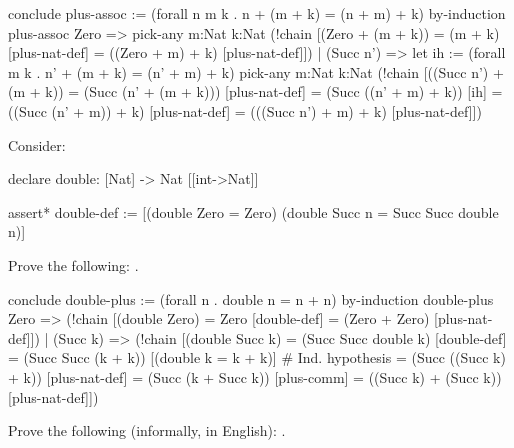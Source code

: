\begin{solution}
\begin{tcAthena}
conclude plus-assoc := (forall n m k . n + (m + k) = (n + m) + k)
  by-induction plus-assoc {
    Zero => pick-any m:Nat k:Nat
             (!chain [(Zero + (m + k)) 
                    = (m + k)                  [plus-nat-def]
                    = ((Zero + m) + k)         [plus-nat-def]])
  | (Succ n') =>                          
      let {ih := (forall m k . n' + (m + k) = (n' + m) + k)}
        pick-any m:Nat k:Nat                      
          (!chain [((Succ n') + (m + k))     
                  = (Succ (n' + (m + k)))      [plus-nat-def]
                  = (Succ ((n' + m) + k))      [ih]
                  = ((Succ (n' + m)) + k)      [plus-nat-def]
                  = (((Succ n') + m) + k)      [plus-nat-def]])
  }
\end{tcAthena}
\end{solution}
\begin{exercise}[subtitle={\mbox{\rm{\em (SF Exercise 1.0.2, p. 28)}}}]
Consider:
\begin{tcAthena}
declare double: [Nat] -> Nat [[int->Nat]]

assert* double-def := [(double Zero = Zero)
                       (double Succ n = Succ Succ double n)]
\end{tcAthena}
Prove the following: . 
\end{exercise}
\begin{solution}
\begin{tcAthena}
conclude double-plus := (forall n . double n = n + n)
  by-induction double-plus {
    Zero => (!chain [(double Zero)
                   = Zero                       [double-def]
                   = (Zero + Zero)              [plus-nat-def]])
  | (Succ k) => (!chain [(double Succ k) 
                       = (Succ Succ double k)   [double-def]
                       = (Succ Succ (k + k))    [(double k = k + k)] # Ind. hypothesis 
                       = (Succ ((Succ k) + k))  [plus-nat-def]
                       = (Succ (k + Succ k))    [plus-comm]
                       = ((Succ k) + (Succ k))  [plus-nat-def]])
  }
\end{tcAthena}
\end{solution}

\begin{exercise}
Prove the following (informally, in English): . 
\end{exercise}

